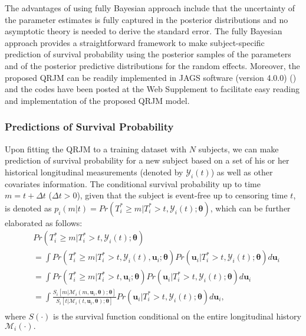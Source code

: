 The advantages of using fully Bayesian approach include that the uncertainty of the parameter estimates is fully captured in the posterior distributions and no asymptotic theory is needed to derive the standard error. The fully Bayesian approach provides a straightforward framework to make subject-specific prediction of survival probability using the posterior samples of the parameters and of the posterior predictive distributions for the random effects. Moreover, the proposed QRJM can be readily implemented in \textsf{JAGS} software (version 4.0.0) (\citealp{plummer2003jags}) and the codes have been posted at the Web Supplement to facilitate easy reading and implementation of the proposed QRJM model.

\subsubsection{Predictions of Survival Probability}\label{sec:pred_survival}
Upon fitting the QRJM to a training dataset with $N$ subjects, we can make prediction of survival probability for a new subject based on a set of his or her historical longitudinal measurements (denoted by $\mathcal{Y}_{i}(t)$) as well as other covariates information. The conditional survival probability up to time $m = t+\Delta t$ ($\Delta t > 0$), given that the subject is event-free up to censoring time $t$, is denoted as $p_i(m|t) = Pr(T_i^*\ge m|T_i^*>t, \mathcal{Y}_{i}(t);\boldsymbol{\theta})$, which can be further elaborated as follows:
\begin{equation}\label{eqn:surv_prob_derv}
     \begin{aligned}
      & Pr(T_i^*\ge m|T_i^*>t, \mathcal{Y}_{i}(t);\boldsymbol{\theta})\\
      &=\int Pr(T_i^*\ge m|T_i^*>t, \mathcal{Y}_{i}(t), {\boldsymbol u}_i;\boldsymbol{\theta})
 {Pr({\boldsymbol u}_i|T_i^*>t, \mathcal{Y}_{i}(t);\boldsymbol{\theta})d{\boldsymbol u}_i}  \\
      &= {\int Pr(T_i^*\ge m|T_i^*>t, {\boldsymbol u}_i;\boldsymbol{\theta})Pr({\boldsymbol u}_i|T_i^*>t, \mathcal{Y}_{i}(t);\boldsymbol{\theta})d{\boldsymbol u}_i} \\
       &= {\int\frac{{S}_i[m|\mathcal{M}_{i}(m,{\boldsymbol u}_i, \boldsymbol{\theta});\boldsymbol{\theta}]}{{S}_i[t|\mathcal{M}_{i}(t,{\boldsymbol u}_i, \boldsymbol{\theta});\boldsymbol{\theta}]}Pr({\boldsymbol u}_i|T_i^*>t, \mathcal{Y}_{i}(t);\boldsymbol{\theta})d{\boldsymbol u}_i}, \\
     \end{aligned}
     \phantom{\hspace{0cm}}
\end{equation}
where ${S}(\cdot)$ is the survival function conditional on the entire longitudinal history $\mathcal{M}_{i}(\cdot).$

